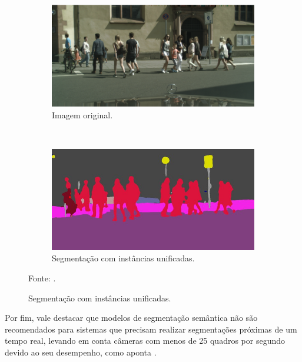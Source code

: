 \begin{figure}[H]
   \caption{Exemplo de segmentação semântica com instâncias unificadas.}
   \centering
   \label{semantic:fig:4}
    \begin{subfigure}[t]{0.45\textwidth}
        \centering
        \includegraphics[width=1.3\linewidth]{recursos/imagens/semantic/sema_ori.png}
        \caption{Imagem original.}
        \label{semantic:fig:4.1}
    \end{subfigure}%
    ~ 

    \begin{subfigure}[t]{0.45\textwidth}
        \centering
        \includegraphics[width=1.3\linewidth]{recursos/imagens/semantic/sema_unified.png}
        \caption{Segmentação com instâncias unificadas.}
        \label{semantic:fig:4.2}
    \end{subfigure}%

    \vspace*{1 cm}
    Fonte: \cite{Fischer2017}.
\end{figure}

Por fim, vale destacar que modelos de segmentação semântica não são recomendados para sistemas que precisam realizar segmentações próximas de um tempo real, levando em conta câmeras com menos de 25 quadros por segundo devido ao seu desempenho, como aponta \cite{Minaee2021}.